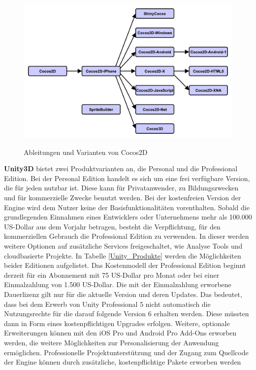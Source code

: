 \begin{figure}[htbp]
	\centering
	\includegraphics[width=1\textwidth]{Bilder/Cocos2d_Relationships}
	\caption{Ableitungen und Varianten von Cocos2D}\label{graph_Cocos2d_Relationships}\citep{cocos2d_relationships}
\end{figure}

\bigskip
\textbf{Unity3D} bietet zwei Produktvarianten an, die Personal und die Professional Edition. Bei der Personal Edition handelt es sich um eine frei verfügbare Version, die für jeden nutzbar ist. Diese kann für Privatanwender, zu Bildungszwecken und für kommerzielle Zwecke benutzt werden. Bei der kostenfreien Version der Engine wird dem Nutzer keine der Basisfunktionalitäten vorenthalten. Sobald die grundlegenden Einnahmen eines Entwicklers oder Unternehmens mehr als 100.000 US-Dollar aus dem Vorjahr betragen, besteht die Verpflichtung, für den kommerziellen Gebrauch die Professional Edition zu verwenden. In dieser werden weitere Optionen auf zusätzliche Services freigeschaltet, wie Analyse Tools und cloudbasierte Projekte. In Tabelle \ref{Unity_Produkte} werden die Möglichkeiten beider Editionen aufgelistet. Das Kostenmodell der Professional Edition beginnt derzeit für ein Abonnement mit 75 US-Dollar pro Monat oder bei einer Einmalzahlung von 1.500 US-Dollar. Die mit der Einmalzahlung erworbene Dauerlizenz gilt nur für die aktuelle Version und deren Updates. Das bedeutet, dass bei dem Erwerb von Unity Professional 5 nicht automatisch die Nutzungsrechte für die darauf folgende Version 6 erhalten werden. Diese müssten dann in Form eines kostenpflichtigen Upgrades erfolgen. Weitere, optionale Erweiterungen können mit den iOS Pro und Android Pro Add-Ons erworben werden, die weitere Möglichkeiten zur Personalisierung der Anwendung ermöglichen. Professionelle Projektunterstützung und der Zugang zum Quellcode der Engine können durch zusätzliche, kostenpflichtige Pakete erworben werden \citep{unity_products}

